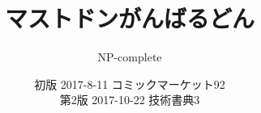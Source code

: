 \title{マストドンがんばるどん}
\author{NP-complete}
\date{初版 2017-8-11 コミックマーケット92 \\
第2版 2017-10-22 技術書典3}
\Huge
\maketitle
\normalsize
